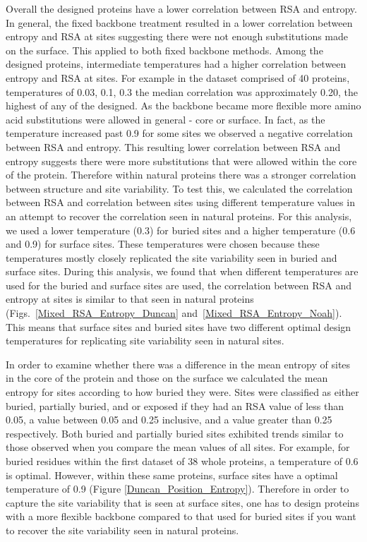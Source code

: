 \documentclass[12pt]{article}
\begin{document}
{\color{blue}
Overall the designed proteins have a lower correlation between RSA and entropy.  In general, the fixed backbone treatment resulted in a lower correlation between entropy and RSA at sites suggesting there were not enough substitutions made on the surface.  This applied to both fixed backbone methods. Among the designed proteins, intermediate temperatures had a higher correlation between entropy and RSA at sites. For example in the dataset comprised of 40 proteins, temperatures of 0.03, 0.1, 0.3 the median correlation was approximately 0.20, the highest of any of the designed. As the backbone became more flexible more amino acid substitutions were allowed in general - core or surface. In fact, as the temperature increased past 0.9 for some sites we observed a negative correlation between RSA and entropy.  This resulting lower correlation between RSA and entropy suggests there were more substitutions that were allowed within the core of the protein. Therefore within natural proteins there was a stronger correlation between structure and site variability.  To test this, we calculated the correlation between RSA and correlation between sites using different temperature values in an attempt to recover the correlation seen in natural proteins. For this analysis, we used a lower temperature (0.3) for buried sites and a higher temperature (0.6 and 0.9) for surface sites. These temperatures were chosen because these temperatures mostly closely replicated the site variability seen in buried and surface sites. During this analysis, we found that when different temperatures are used for the buried and surface sites are used, the correlation between RSA and entropy at sites is similar to that seen in natural proteins (Figs.~\ref{Mixed_RSA_Entropy_Duncan} and~\ref{Mixed_RSA_Entropy_Noah}). This means that surface sites and buried sites have two different optimal design temperatures for replicating site variability seen in natural sites. 



In order to examine whether there was a difference in the mean entropy of sites in the core of the protein and those on the surface we calculated the mean entropy for sites according to how buried they were. Sites were classified as either buried, partially buried, and or exposed if they had an RSA value of less than 0.05, a value between 0.05 and 0.25 inclusive, and a value greater than 0.25 respectively. Both buried and partially buried sites exhibited trends similar to those observed when you compare the mean values of all sites. For example, for buried residues within the first dataset of 38 whole proteins, a temperature of 0.6 is optimal. However, within these same proteins, surface sites have a optimal temperature of 0.9 (Figure \ref{Duncan_Position_Entropy}). Therefore in order to capture the site variability that is seen at surface sites, one has to design proteins with a more flexible backbone compared to that used for buried sites if you want to recover the site variability seen in natural proteins. 
}
\end{document}
